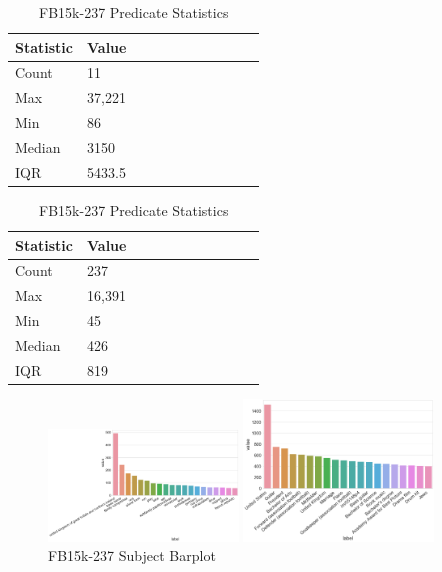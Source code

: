 \begin{table}[H]
	\parbox{.5\linewidth}{
		\caption{WN18RR Predicate Statistics}
		\centering
		\begin{tabular}{lllllllllll}
  			\textbf{Statistic} & \textbf{Value}  \\
  			\hline
			Count & 11 \\
			Max & 37,221  \\
			Min & 86 \\
  			Median & 3150  \\
  			IQR & 5433.5  \\
		\end{tabular}
		}
	\hfill
	\parbox{.5\linewidth}{
		\caption{FB15k-237 Predicate Statistics}
		\centering
		\begin{tabular}{lllllllllll}
  			\textbf{Statistic} & \textbf{Value}  \\
  			\hline
			Count & 237 \\
			Max & 16,391 \\
			Min & 45  \\
  			Median & 426  \\
  			IQR & 819 \\
		\end{tabular}
		}
\end{table}


\begin{figure}[H]
	\parbox{.5\linewidth}{
   		\caption{WN18RR Subject Barplot}
   		\centering
    		\includegraphics[width=0.45\textwidth, height=0.2\textheight]{WN18RR_Subject_Counts}
		}
	\hfill
	\parbox{.5\linewidth}{
		\caption{FB15k-237 Subject Barplot}
   		\centering
		\includegraphics[width=0.45\textwidth, height=0.2\textheight]{FB15k-237_Subject_Counts}
		}
\end{figure}


